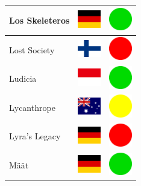 \documentclass[12pt, a4paper, twoside]{report}
\begin{document}
\begin{center}
\begin{longtable}{|p{5cm}|p{2cm}|p{2cm}|}
			Los Skeleteros & \includegraphics[width=1cm]{4x3/de} & \includegraphics[width=1cm]{likes/y} \\ \hline
			Lost Society & \includegraphics[width=1cm]{4x3/fi} & \includegraphics[width=1cm]{likes/n} \\ \hline
			Ludicia & \includegraphics[width=1cm]{4x3/id} & \includegraphics[width=1cm]{likes/y} \\ \hline
			Lycanthrope & \includegraphics[width=1cm]{4x3/au} & \includegraphics[width=1cm]{likes/m} \\ \hline
			Lyra's Legacy & \includegraphics[width=1cm]{4x3/de} & \includegraphics[width=1cm]{likes/n} \\ \hline
			Määt & \includegraphics[width=1cm]{4x3/de} & \includegraphics[width=1cm]{likes/y} \\ \hline

\end{longtable}
\end{center}
\end{document}
